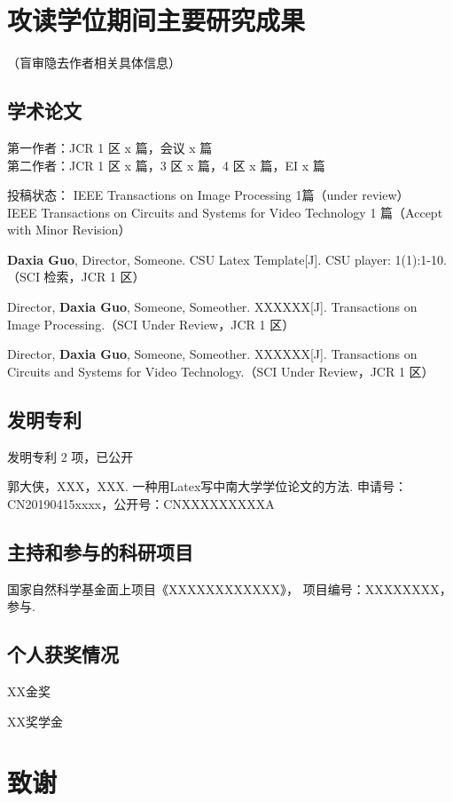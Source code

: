\section{攻读学位期间主要研究成果} %

\ifblindreview
\noindent
（盲审隐去作者相关具体信息）
\fi
\subsection*{学术论文}

\ifblindreview

\noindent
第一作者：JCR 1 区 x 篇，会议 x 篇 \\{}
第二作者：JCR 1 区 x 篇，3 区 x 篇，4 区 x 篇，EI x 篇 

\noindent
投稿状态： 
IEEE Transactions on Image Processing 1篇（under review）\\{}
IEEE Transactions on Circuits and Systems for Video Technology 1 篇（Accept with Minor Revision）
\else
\begin{enumerate}[label={[\arabic*]}]
\item \textbf{Daxia Guo}, Director, Someone. CSU Latex Template[J]. CSU player: 1(1):1-10. （SCI 检索，JCR 1 区）
\item Director, \textbf{Daxia Guo}, Someone, Someother. XXXXXX[J]. Transactions on Image Processing.（SCI Under Review，JCR 1 区）
\item Director, \textbf{Daxia Guo}, Someone, Someother. XXXXXX[J]. Transactions on Circuits and Systems for Video Technology.（SCI Under Review，JCR 1 区）
\end{enumerate}
\fi
\subsection*{发明专利}
\ifblindreview
\noindent
发明专利 2 项，已公开
\else
\begin{enumerate}[label={[\arabic*]}]
\item 郭大侠，XXX，XXX. 一种用Latex写中南大学学位论文的方法. 申请号：CN20190415xxxx，公开号：CNXXXXXXXXXA
\end{enumerate}
\fi

\ifblindreview
\else
\subsection*{主持和参与的科研项目}
\begin{enumerate}[label={[\arabic*]}]
\item 国家自然科学基金面上项目《XXXXXXXXXXXX》， 项目编号：XXXXXXXX，参与.
\end{enumerate}

\subsection*{个人获奖情况}
\noindent
\begin{enumerate}[label={[\arabic*]}]
\item XX金奖
\item XX奖学金
\end{enumerate}
\fi

\newpage

\ifblindreview
\else
\section{致谢} %
\lipsum
\newpage
\fi